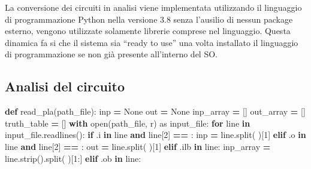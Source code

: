 \documentclass[
  italian,
]{book}
\newenvironment{Shaded}{\begin{snugshade}}{\end{snugshade}}
\newcommand{\BuiltInTok}[1]{#1}
\newcommand{\ControlFlowTok}[1]{\textcolor[rgb]{0.13,0.29,0.53}{\textbf{#1}}}
\newcommand{\DecValTok}[1]{\textcolor[rgb]{0.00,0.00,0.81}{#1}}
\newcommand{\ImportTok}[1]{#1}
\newcommand{\KeywordTok}[1]{\textcolor[rgb]{0.13,0.29,0.53}{\textbf{#1}}}
\newcommand{\NormalTok}[1]{#1}
\newcommand{\OperatorTok}[1]{\textcolor[rgb]{0.81,0.36,0.00}{\textbf{#1}}}
\newcommand{\StringTok}[1]{\textcolor[rgb]{0.31,0.60,0.02}{#1}}
\newcommand{\VariableTok}[1]{\textcolor[rgb]{0.00,0.00,0.00}{#1}}
\begin{document}
La conversione dei circuiti in analisi viene implementata utilizzando il linguaggio di programmazione Python nella versione 3.8 senza l'ausilio di nessun package esterno, vengono utilizzate solamente librerie comprese nel linguaggio. Questa dinamica fa si che il sistema sia ``ready to use'' una volta installato il linguaggio di programmazione se non già presente all'interno del SO.

\hypertarget{analisi-del-circuito}{%
\subsection{Analisi del circuito}\label{analisi-del-circuito}}

\begin{Shaded}
\begin{Highlighting}[]
\KeywordTok{def}\NormalTok{ read\_pla(path\_file):}
\NormalTok{    inp }\OperatorTok{=} \VariableTok{None}
\NormalTok{    out }\OperatorTok{=} \VariableTok{None}
\NormalTok{    inp\_array }\OperatorTok{=}\NormalTok{ []}
\NormalTok{    out\_array }\OperatorTok{=}\NormalTok{ []}
\NormalTok{    truth\_table }\OperatorTok{=}\NormalTok{ []}
    \ControlFlowTok{with} \BuiltInTok{open}\NormalTok{(path\_file, }\StringTok{\textquotesingle{}r\textquotesingle{}}\NormalTok{) }\ImportTok{as}\NormalTok{ input\_file:}
        \ControlFlowTok{for}\NormalTok{ line }\KeywordTok{in}\NormalTok{ input\_file.readlines():}
            \ControlFlowTok{if} \StringTok{\textquotesingle{}.i\textquotesingle{}} \KeywordTok{in}\NormalTok{ line }\KeywordTok{and}\NormalTok{ line[}\DecValTok{2}\NormalTok{] }\OperatorTok{==} \StringTok{\textquotesingle{} \textquotesingle{}}\NormalTok{:}
\NormalTok{                inp }\OperatorTok{=}\NormalTok{ line.split(}\StringTok{\textquotesingle{} \textquotesingle{}}\NormalTok{)[}\DecValTok{1}\NormalTok{]}
            \ControlFlowTok{elif} \StringTok{\textquotesingle{}.o\textquotesingle{}} \KeywordTok{in}\NormalTok{ line }\KeywordTok{and}\NormalTok{ line[}\DecValTok{2}\NormalTok{] }\OperatorTok{==} \StringTok{\textquotesingle{} \textquotesingle{}}\NormalTok{:}
\NormalTok{                out }\OperatorTok{=}\NormalTok{ line.split(}\StringTok{\textquotesingle{} \textquotesingle{}}\NormalTok{)[}\DecValTok{1}\NormalTok{]}
            \ControlFlowTok{elif} \StringTok{\textquotesingle{}.ilb\textquotesingle{}} \KeywordTok{in}\NormalTok{ line:}
\NormalTok{                inp\_array }\OperatorTok{=}\NormalTok{ line.strip().split(}\StringTok{\textquotesingle{} \textquotesingle{}}\NormalTok{)[}\DecValTok{1}\NormalTok{:]}
            \ControlFlowTok{elif} \StringTok{\textquotesingle{}.ob\textquotesingle{}} \KeywordTok{in}\NormalTok{ line:}

\end{Highlighting}
\end{Shaded}
\end{document}

